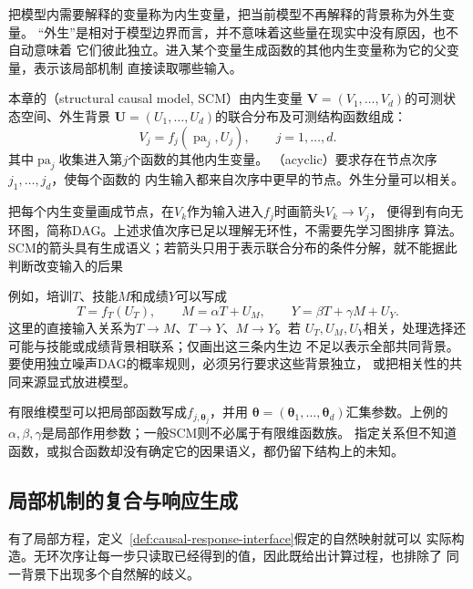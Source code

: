 把模型内需要解释的变量称为内生变量，把当前模型不再解释的背景称为外生变量。
“外生”是相对于模型边界而言，并不意味着这些量在现实中没有原因，也不自动意味着
它们彼此独立。进入某个变量生成函数的其他内生变量称为它的父变量，表示该局部机制
直接读取哪些输入。

\begin{definition}[无环结构因果模型]
  \label{def:causal-structural-model}
  本章的（structural causal model, SCM）由内生变量
  \(\bm V=(V_1,\ldots,V_d)\)的可测状态空间、外生背景
  \(\bm U=(U_1,\ldots,U_d)\)的联合分布及可测结构函数组成：
  \begin{equation}
    V_j=f_j(\operatorname{pa}_j,U_j),
    \qquad j=1,\ldots,d.
    \label{eq:causal-scm-definition}
  \end{equation}
  其中\(\operatorname{pa}_j\)收集进入第\(j\)个函数的其他内生变量。
  （acyclic）要求存在节点次序\(j_1,\ldots,j_d\)，使每个函数的
  内生输入都来自次序中更早的节点。外生分量可以相关。
\end{definition}

把每个内生变量画成节点，在\(V_k\)作为输入进入\(f_j\)时画箭头\(V_k\to V_j\)，
便得到有向无环图，简称DAG。上述求值次序已足以理解无环性，不需要先学习图排序
算法。SCM的箭头具有生成语义；若箭头只用于表示联合分布的条件分解，就不能据此
判断改变输入的后果

例如，培训\(T\)、技能\(M\)和成绩\(Y\)可以写成
\[
  T=f_T(U_T),\qquad
  M=\alpha T+U_M,\qquad
  Y=\beta T+\gamma M+U_Y.
\]
这里的直接输入关系为\(T\to M\)、\(T\to Y\)、\(M\to Y\)。若
\(U_T,U_M,U_Y\)相关，处理选择还可能与技能或成绩背景相联系；仅画出这三条内生边
不足以表示全部共同背景。要使用独立噪声DAG的概率规则，必须另行要求这些背景独立，
或把相关性的共同来源显式放进模型。

有限维模型可以把局部函数写成\(f_{j,\bm\theta_j}\)，并用
\(\bm\theta=(\bm\theta_1,\ldots,\bm\theta_d)\)汇集参数。上例的
\(\alpha,\beta,\gamma\)是局部作用参数；一般SCM则不必属于有限维函数族。
指定关系但不知道函数，或拟合函数却没有确定它的因果语义，都仍留下结构上的未知。

\subsection{局部机制的复合与响应生成}
\label{sec:causal-mechanism-composition}

有了局部方程，定义~\ref{def:causal-response-interface}假定的自然映射就可以
实际构造。无环次序让每一步只读取已经得到的值，因此既给出计算过程，也排除了
同一背景下出现多个自然解的歧义。

